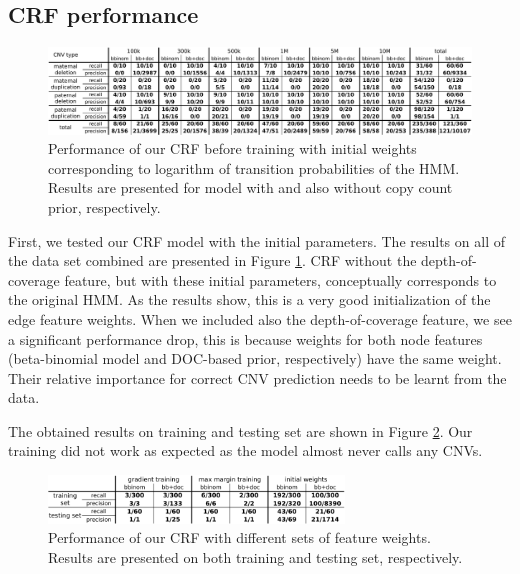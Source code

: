 \subsection{CRF performance}
\begin{figure}
\caption{Performance of our CRF before training with initial weights corresponding to logarithm of transition probabilities of the HMM. Results are presented for model with and also without copy count prior, respectively.}
\label{fig:CRFinit}
\centering
\hspace*{-8pt}
\includegraphics[width=1.03\textwidth]{figures/crf_initial_all}
\end{figure}
First, we tested our CRF model with the initial parameters. The results on all of the data set combined are presented in Figure \ref{fig:CRFinit}. CRF without the depth-of-coverage feature, but with these initial parameters, conceptually corresponds to the original HMM. As the results show, this is a very good initialization of the edge feature weights. When we included also the depth-of-coverage feature, we see a significant performance drop, this is because weights for both node features (beta-binomial model and DOC-based prior, respectively) have the same weight. Their relative importance for correct CNV prediction needs to be learnt from the data.


The obtained results on training and testing set are shown in Figure \ref{fig:CRFresAll}. Our training did not work as expected as the model almost never calls any CNVs.

\begin{figure}
\caption{Performance of our CRF with different sets of feature weights. Results are presented on both training and testing set, respectively.}
\label{fig:CRFresAll}
\centering
\includegraphics[width=0.7\textwidth]{figures/crf_res_all}
\end{figure}

